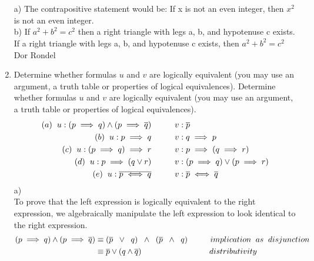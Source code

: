 \documentclass{article}
\newcommand\tab[1][1cm]{\hspace*{#1}}
\newcommand\tabsmall[1][0.2cm]{\hspace*{#1}}
\begin{document}
\begin{enumerate}
    \newline \\ \\
    a) The contrapositive statement would be: If x is not an even integer, then $x^2$ is not an even integer. 
    \newline \\
    b) If $a^2 + b^2 = c^2$ then a right triangle with legs a, b, and           hypotenuse c exists. \\
    \newline 
    If a right triangle with legs a, b, and hypotenuse c exists, then $a^2 +     b^2 = c^2$
\newpage
Dor Rondel \\
    \item Determine whether formulas $u$ and $v$ are logically equivalent         (you may use an argument, a truth table or properties of logical             equivalences).
    Determine whether formulas $u$ and $v$ are logically equivalent (you may use an argument, a truth table or properties of logical equivalences).
\begin{align*}
 (a) \tabsmall u: (p \implies q) \land (p \implies \overline{q}) \tab & v: \overline{p} \\
 (b)  \tabsmall u: p \implies q \tab                                  & v: q \implies p \\
 (c) \tabsmall u: (p \implies q) \implies r\tab                       & v: p \implies (q \implies r) \\
 (d) \tabsmall u: p \implies (q \lor r) \tab                          & v: (p \implies q) \lor (p \implies r) \\
 (e) \tabsmall u: \overline{p \iff q}\tab                             & v: \overline{p} \iff \overline{q} \\
\end{align*} 
a) \\
\newline
To prove that the left expression is logically equivalent to the right expression, we algebraically manipulate the left expression to look identical to the right expression. \\
\begin{align*}
(p \implies q) \land (p \implies \overline{q}) &\equiv (\overline{p} \tabsmall \lor  \tabsmall q) \tabsmall \land \tabsmall (\overline{p} \tabsmall \land \tabsmall q) \tab implication \tabsmall as \tabsmall disjunction \\
                                                  &\equiv \overline{p} \lor (q \land \overline{q}) \tab \tab \tab distributivity \\

\end{align*}
\end{enumerate}
\end{document}
